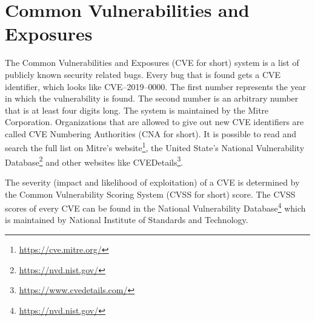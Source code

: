 \section{Common Vulnerabilities and Exposures}
The Common Vulnerabilities and Exposures (CVE for short) system is a list of publicly known security related bugs. Every bug that is found gets a CVE identifier, which looks like CVE--2019--0000. The first number represents the year in which the vulnerability is found. The second number is an arbitrary number that is at least four digits long. The system is maintained by the Mitre Corporation. Organizations that are allowed to give out new CVE identifiers are called CVE Numbering Authorities (CNA for short). It is possible to read and search the full list on Mitre's website\footnote{\url{https://cve.mitre.org/}}, the United State's National Vulnerability Database\footnote{\url{https://nvd.nist.gov/}} and other websites like CVEDetails\footnote{\url{https://www.cvedetails.com/}}.

The severity (impact and likelihood of exploitation) of a CVE is determined by the Common Vulnerability Scoring System (CVSS for short) score. The CVSS scores of every CVE can be found in the National Vulnerability Database\footnote{\url{https://nvd.nist.gov/}} which is maintained by National Institute of Standards and Technology.
